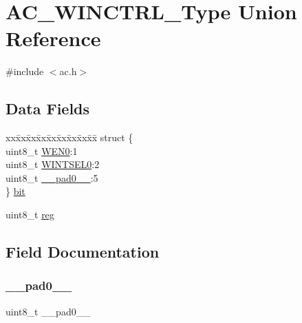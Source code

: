 \hypertarget{union_a_c___w_i_n_c_t_r_l___type}{}\section{A\+C\+\_\+\+W\+I\+N\+C\+T\+R\+L\+\_\+\+Type Union Reference}
\label{union_a_c___w_i_n_c_t_r_l___type}


{\ttfamily \#include $<$ac.\+h$>$}

\subsection*{Data Fields}
\begin{DoxyCompactItemize}
\item 
\begin{tabbing}
xx\=xx\=xx\=xx\=xx\=xx\=xx\=xx\=xx\=\kill
struct \{\\
\>uint8\_t \mbox{\hyperlink{union_a_c___w_i_n_c_t_r_l___type_a18b77b5ab88790454389633019b309f0}{WEN0}}:1\\
\>uint8\_t \mbox{\hyperlink{union_a_c___w_i_n_c_t_r_l___type_a564a6fad73f4fb70c2f1df3bf586aff4}{WINTSEL0}}:2\\
\>uint8\_t \mbox{\hyperlink{union_a_c___w_i_n_c_t_r_l___type_a8b4eebe79ded0459acec2f4950102ba3}{\_\_pad0\_\_}}:5\\
\} \mbox{\hyperlink{union_a_c___w_i_n_c_t_r_l___type_ac747914da1b8a36c9e2ac6cf22aac938}{bit}}\\

\end{tabbing}\item 
uint8\+\_\+t \mbox{\hyperlink{union_a_c___w_i_n_c_t_r_l___type_a9428adc9af4653a2050e2536b55dec8d}{reg}}
\end{DoxyCompactItemize}


\subsection{Field Documentation}
\mbox{\label{union_a_c___w_i_n_c_t_r_l___type_a8b4eebe79ded0459acec2f4950102ba3}} 
\subsubsection{\texorpdfstring{\_\_pad0\_\_}{\_\_pad0\_\_}}
{\footnotesize\ttfamily uint8\+\_\+t \+\_\+\+\_\+pad0\+\_\+\+\_\+}

